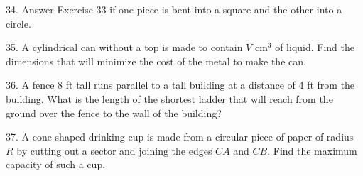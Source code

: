 \documentclass{sebase}
\begin{document}
\begin{multicols}{2}
\begin{ExerciseList}
\item[\hfill 34.] Answer Exercise 33 if one piece is bent into a square and
the other into a circle.

%

\item[\hfill 35.] A cylindrical can without a top is made to contain $V$ $%
\mathrm{cm}^{3}$ of liquid. Find the dimensions that will minimize the cost
of the metal to make the can.

%

%

\item[\hfill 36.] A fence 8 ft tall runs parallel to a tall building at a
distance of 4 ft from the building. What is the length of the shortest
ladder that will reach from the ground over the fence to the wall of the
building?

%

\item[\hfill 37.] A cone-shaped drinking cup is made from a circular piece
of paper of radius $R$ by cutting out a sector and joining the edges $CA$
and $CB$. Find the maximum capacity of such a cup.\\[4pt]
\hspace*{\fill}\hspace*{\fill}

%


\end{ExerciseList}
\end{multicols}
\end{document}
